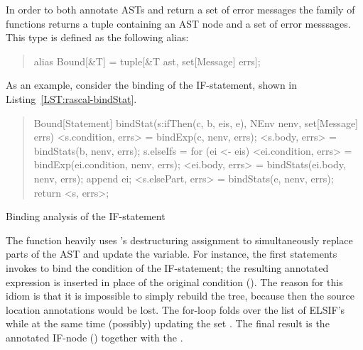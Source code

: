In order to both annotate ASTs and return a set of error messages the
 family of functions returns a tuple containing an AST
node and a set of error messsages. This type is defined as the
following \Rascal alias:
\begin{quote}
\begin{rascal}
alias Bound[&T] = tuple[&T ast, set[Message] errs];
\end{rascal}
\end{quote}

As an example, consider the binding of the IF-statement, 
shown in Listing~\ref{LST:rascal-bindStat}.
\begin{listing}
\begin{quote}\small
\begin{rascal}
Bound[Statement] bindStat(s:ifThen(c, b, eis, e), 
                     NEnv nenv, set[Message] errs) {
    <s.condition, errs> = bindExp(c, nenv, errs);
    <s.body, errs> = bindStats(b, nenv, errs);
    s.elseIfs = for (ei <- eis) {
      <ei.condition, errs> = bindExp(ei.condition, nenv, errs);
      <ei.body, errs> = bindStats(ei.body, nenv, errs);
      append ei;
    }
    <s.elsePart, errs> = bindStats(e, nenv, errs);
    return <s, errs>;
}
\end{rascal}
\end{quote}
\caption{Binding analysis of the \oberon IF-statement}
\label{LST:rascal-bindStat}
\end{listing}
The function heavily uses \Rascal's destructuring assignment to
simultaneously replace parts of the AST and update the 
variable. For instance, the first statements invokes 
to bind the condition of the IF-statement; the resulting annotated
expression is inserted in place of the original condition
(). The reason for this idiom is that it is
impossible to simply rebuild the tree, because then the source
location annotations would be lost. The for-loop folds over the list
of ELSIF's while at the same time (possibly) updating the set
. The final result is the annotated IF-node
() together with the .

